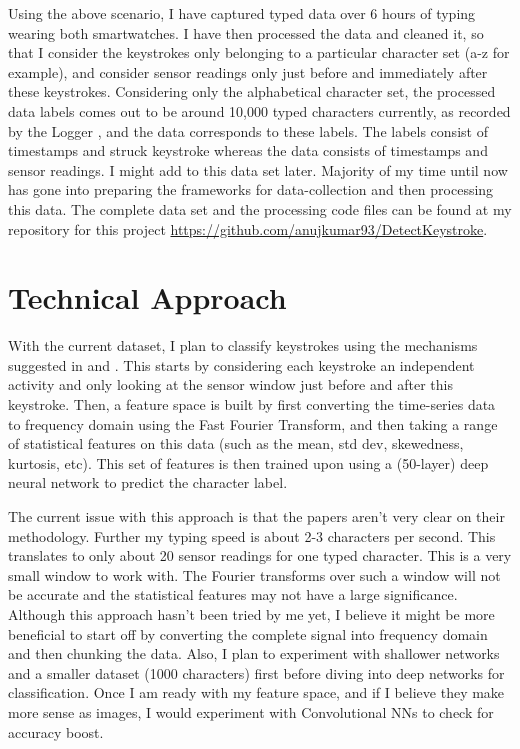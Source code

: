 \documentclass[10pt,twocolumn,letterpaper]{article}
\begin{document}
Using the above scenario, I have captured typed data over 6 hours of typing wearing both smartwatches. I have then processed the data and cleaned it, so that I consider the keystrokes only belonging to a particular character set (a-z for example), and consider sensor readings only just before and immediately after these keystrokes. Considering only the alphabetical character set, the processed data labels comes out to be around 10,000 typed characters currently, as recorded by the Logger \cite{keyfreq}, and the data corresponds to these labels. The labels consist of timestamps and struck keystroke whereas the data consists of timestamps and sensor readings. I might add to this data set later. Majority of my time until now has gone into preparing the frameworks for data-collection \cite{app}\cite{keyfreq} and then processing this data. The complete data set and the processing code files can be found at my repository for this project \url{https://github.com/anujkumar93/DetectKeystroke}.

\section{Technical Approach}
With the current dataset, I plan to classify keystrokes using the mechanisms suggested in \cite{maiti} and \cite{wang}. This starts by considering each keystroke an independent activity and only looking at the sensor window just before and after this keystroke. Then, a feature space is built by first converting the time-series data to frequency domain using the Fast Fourier Transform, and then taking a range of statistical features on this data (such as the mean, std dev, skewedness, kurtosis, etc). This set of features is then trained upon using a (50-layer) deep neural network to predict the character label. 

The current issue with this approach is that the papers aren't very clear on their methodology. Further my typing speed is about 2-3 characters per second. This translates to only about 20 sensor readings for one typed character. This is a very small window to work with. The Fourier transforms over such a window will not be accurate and the statistical features may not have a large significance. Although this approach hasn't been tried by me yet, I believe it might be more beneficial to start off by converting the complete signal into frequency domain and then chunking the data. Also, I plan to experiment with shallower networks and a smaller dataset (1000 characters) first before diving into deep networks for classification. Once I am ready with my feature space, and if I believe they make more sense as images, I would experiment with Convolutional NNs to check for accuracy boost.
\end{document}
